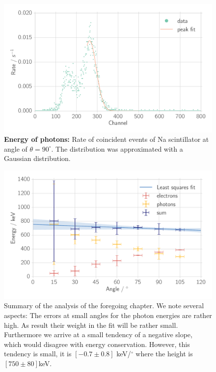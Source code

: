\begin{figure}[htpb]
    \centering
    \includegraphics[width=0.9\linewidth]{./analysis/figures/coin_na_90}
\caption{\textbf{Energy of photons:} Rate of coincident events of 
        Na scintillator at angle of $\theta = 90^\circ$. The distribution 
    was approximated with a Gaussian distribution. }
\label{fig:coin_na_90}
\end{figure}


\begin{figure}[htpb]
    \centering
    \includegraphics[width=0.9\linewidth]{./analysis/figures/energy_conservation}
    \caption{Summary of the analysis of the foregoing chapter. We note several aspects:
    The errors at small angles for the photon energies are rather high. 
    As result their weight in the fit will
    be rather small. Furthermore we arrive at a small tendency of a negative slope, which
    would disagree with energy conservation. However, this tendency is small, it is
    $[-0.7 \pm 0.8]$ keV/$^\circ$ where the height is $[750 \pm 80]$keV.}
\label{fig:energy_conservation}
\end{figure}

